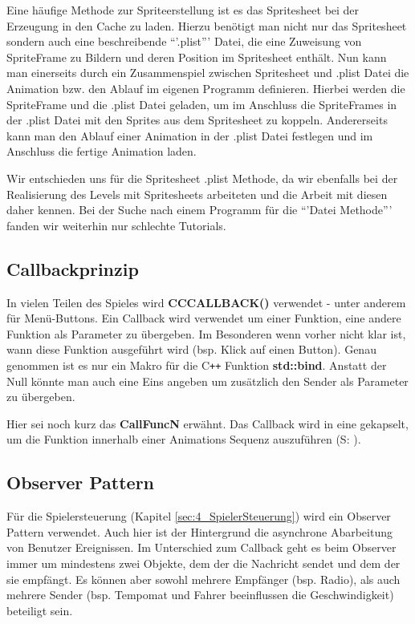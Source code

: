 Eine häufige Methode zur Spriteerstellung ist es das Spritesheet bei der Erzeugung in den Cache zu laden. 
Hierzu benötigt man nicht nur das Spritesheet sondern auch eine beschreibende “'.plist”' Datei, die eine Zuweisung von SpriteFrame zu Bildern und deren Position im Spritesheet enthält. Nun kann man einerseits durch ein Zusammenspiel zwischen Spritesheet und .plist Datei die Animation bzw. den Ablauf im eigenen Programm definieren. Hierbei werden die SpriteFrame und die .plist Datei geladen, um im Anschluss die SpriteFrames in der .plist Datei mit den Sprites aus dem Spritesheet zu koppeln. Andererseits kann man den Ablauf einer Animation in der .plist Datei festlegen und im Anschluss die fertige Animation laden.

Wir entschieden uns für die Spritesheet .plist Methode, da wir ebenfalls bei der Realisierung des Levels mit Spritesheets arbeiteten und die Arbeit mit diesen daher kennen. Bei der Suche nach einem Programm für die “'Datei Methode”' fanden wir weiterhin nur schlechte Tutorials.




\subsection{Callbackprinzip}\label{sec:2_Callbackprinzip}
In vielen Teilen des Spieles wird \textbf{CC\textunderscore CALLBACK()} verwendet - unter anderem für Menü-Buttons. Ein Callback wird verwendet um einer Funktion, eine andere Funktion als Parameter zu übergeben. Im Besonderen wenn vorher nicht klar ist, wann diese Funktion ausgeführt wird (bsp. Klick auf einen Button). Genau genommen ist es nur ein Makro für die C\texttt{++} Funktion \textbf{std::bind}. Anstatt der Null könnte man auch eine Eins angeben um zusätzlich den Sender als Parameter zu übergeben.

Hier sei noch kurz das \textbf{CallFuncN} erwähnt. Das Callback wird in eine  gekapselt, um die Funktion innerhalb einer Animations Sequenz auszuführen (S: \pageref{lst:CallFuncN}).


\subsection{Observer Pattern}

Für die Spielersteuerung (Kapitel \ref{sec:4_SpielerSteuerung}) wird ein Observer Pattern verwendet. Auch hier ist der Hintergrund die asynchrone Abarbeitung von Benutzer Ereignissen. Im Unterschied zum Callback geht es beim Observer immer um mindestens zwei Objekte, dem der die Nachricht sendet und dem der sie empfängt. Es können aber sowohl mehrere Empfänger (bsp. Radio), als auch mehrere Sender (bsp. Tempomat und Fahrer beeinflussen die Geschwindigkeit) beteiligt sein.

